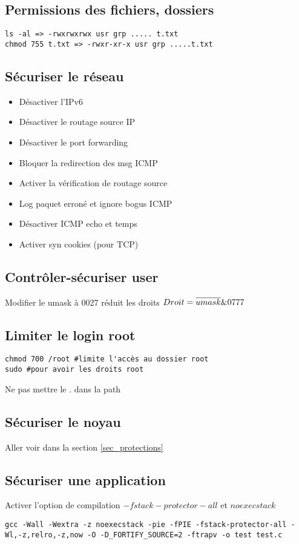 \documentclass[resume]{subfiles}
\begin{document}
\subsection{Permissions des fichiers, dossiers}
\label{sec_filePerm}
\begin{lstlisting}[style=console]
ls -al => -rwxrwxrwx usr grp ..... t.txt
chmod 755 t.txt => -rwxr-xr-x usr grp .....t.txt
\end{lstlisting}

\subsection{Sécuriser le réseau}
\begin{itemize}
\item Désactiver l'IPv6
\item Désactiver le routage source IP
\item Désactiver le port forwarding
\item Bloquer la redirection des msg ICMP
\item Activer la vérification de routage source
\item Log paquet erroné et ignore bogus ICMP
\item Désactiver ICMP echo et temps
\item Activer syn cookies (pour TCP)
\end{itemize}

\subsection{Contrôler-sécuriser user}
\label{sec_usrPerm}
Modifier le umask à 0027 réduit les droits
$Droit = \overline{umask}\space \& 0777$

\subsection{Limiter le login root}
\begin{lstlisting}[style=console]
chmod 700 /root #limite l'accès au dossier root
sudo #pour avoir les droits root
\end{lstlisting}
Ne pas mettre le . dans la path

\subsection{Sécuriser le noyau}
Aller voir dans la section \ref{sec_protections}

\subsection{Sécuriser une application}
Activer l'option de compilation $-fstack-protector-all$ et $noexecstack$
\begin{lstlisting}[style=console]
gcc -Wall -Wextra -z noexecstack -pie -fPIE -fstack-protector-all -Wl,-z,relro,-z,now -O -D_FORTIFY_SOURCE=2 -ftrapv -o test test.c
\end{lstlisting}
\end{document}
